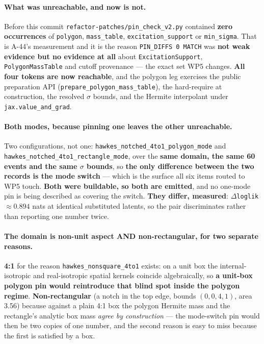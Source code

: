 \documentclass[
  10pt,
]{article}
\begin{document}
\paragraph{What was unreachable, and now is not.}
Before this commit \texttt{refactor-patches/\allowbreak{}pin\_check\_v2.py} contained \textbf{zero occurrences} of \texttt{polygon}, \texttt{mass\_table}, \texttt{excitation\_support} or \texttt{min\_sigma}. That is A-44's measurement and it is the reason \texttt{PIN\_DIFFS 0 MATCH} was \textbf{not weak evidence but no evidence at all} about \texttt{ExcitationSupport}, \texttt{PolygonMassTable} and cutoff provenance --- the exact set WP5 changes. \textbf{All four tokens are now reachable}, and the polygon leg exercises the public preparation API (\texttt{prepare\_polygon\_mass\_table}), the hard-require at construction, the resolved $\sigma$ bounds, and the Hermite interpolant under \texttt{jax.value\_and\_grad}.

\paragraph{Both modes, because pinning one leaves the other unreachable.}
Two configurations, not one: \texttt{hawkes\_notched\_4to1\_polygon\_mode} and \texttt{hawkes\_notched\_4to1\_rectangle\_mode}, over the \textbf{same domain, the same 60 events and the same $\sigma$ bounds}, so \textbf{the only difference between the two records is the mode switch} --- which is the surface all six items routed to WP5 touch. \textbf{Both were buildable, so both are emitted}, and no one-mode pin is being described as covering the switch. \textbf{They differ, measured}: $\Delta$\texttt{loglik} $\approx 0.894$ nats at identical substituted latents, so the pair discriminates rather than reporting one number twice.

\paragraph{The domain is non-unit aspect AND non-rectangular, for two separate reasons.}
\textbf{4:1} for the reason \texttt{hawkes\_nonsquare\_4to1} exists: on a unit box the internal-isotropic and real-isotropic spatial kernels coincide algebraically, so \textbf{a unit-box polygon pin would reintroduce that blind spot inside the polygon regime}. \textbf{Non-rectangular} (a notch in the top edge, bounds $(0,0,4,1)$, area 3.56) because against a plain 4:1 box the polygon Hermite mass and the rectangle's analytic box mass \emph{agree by construction} --- the mode-switch pin would then be two copies of one number, and the second reason is easy to miss because the first is satisfied by a box.
\end{document}
